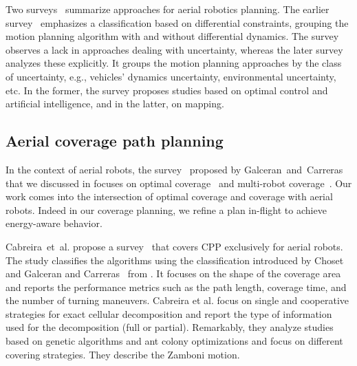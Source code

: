 Two surveys~\citep{goerzen2010survey,dadkhah2012survey} summarize approaches for aerial robotics planning. The earlier survey~\citep{goerzen2010survey} emphasizes a classification based on differential constraints, grouping the motion planning algorithm with and without differential dynamics. The survey observes a lack in approaches dealing with uncertainty, whereas the later survey~\citep{dadkhah2012survey} analyzes these explicitly. It groups the motion planning approaches by the class of uncertainty, e.g., vehicles' dynamics uncertainty, environmental uncertainty, etc. In the former, the survey proposes studies based on optimal control and artificial intelligence, and in the latter, on mapping.

\subsection{Aerial coverage path planning}
\label{sec:cov-plan-aero}

In the context of aerial robots, the survey~\citep{galceran2013survey} proposed by Galceran~and~Carreras that we discussed in  focuses on optimal coverage~\citep{xu2011optimal} and multi-robot coverage~\citep{ahmadzadeh2008optimization,maza2007multiple,barrientos2011aerial,araujo2013multiple}. Our work comes into the intersection of optimal coverage and coverage with aerial robots. Indeed in our coverage planning, we refine a plan in-flight to achieve energy-aware behavior.

Cabreira~et~al. propose a survey~\citep{cabreira2019survey} that covers CPP exclusively for aerial robots. The study classifies the algorithms using the classification introduced by Choset~\citep{choset2001coverage} and Galceran and Carreras~\citep{galceran2013survey} from .
It focuses on the shape of the coverage area and reports the performance metrics such as the path length, coverage time, and the number of turning maneuvers. Cabreira et al. focus on single and cooperative strategies for exact cellular decomposition and report the type of information used for the decomposition (full or partial). Remarkably, they analyze studies based on genetic algorithms and ant colony optimizations and focus on different covering strategies. They describe the Zamboni motion. 

